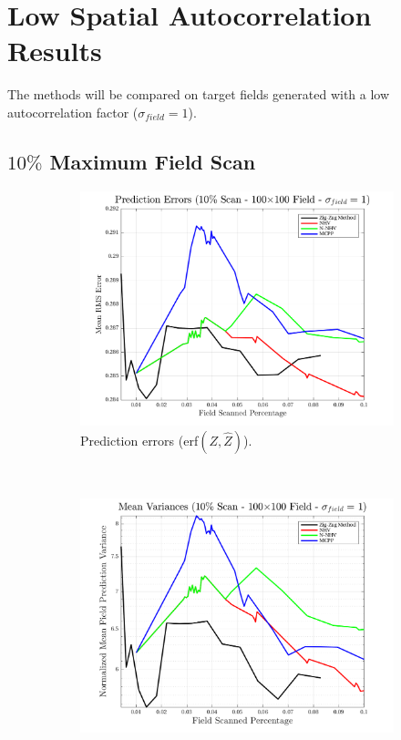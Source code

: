 \section{Low Spatial Autocorrelation Results}
The methods will be compared on target fields generated with a low autocorrelation factor ($\sigma_{field}=1$).

\clearpage
\subsection{$10\%$ Maximum Field Scan}
\begin{figure}[htb!]
    \centering
    \begin{subfigure}[t]{0.65\textwidth}
        \centering
        \includegraphics[width=\linewidth]{figures/hbresults/pred_errs_10p_100x100_sf_1_seed_3.png}
        \captionsetup{skip=0.20\baselineskip,size=footnotesize}
        \caption{Prediction errors (erf$(Z,\hat{Z})$).}
        \label{fig:prederrs_sigma1_p10_s3}
    \end{subfigure}%
    \\
    \begin{subfigure}[t]{0.65\textwidth}
        \centering
        \includegraphics[width=\linewidth]{figures/hbresults/vars_10p_100x100_sf_1_seed_3.png}

\end{subfigure}
\end{figure}
